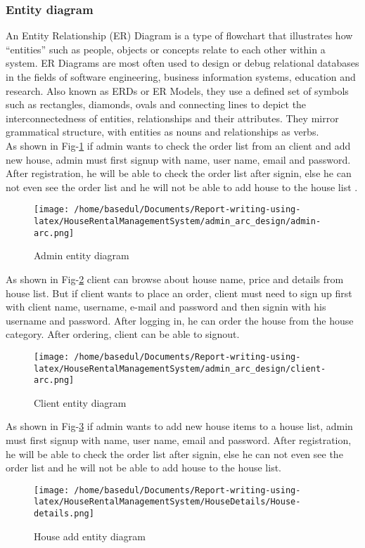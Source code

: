 \documentclass[12pt,a4paper]{article}
\newcommand\tab[1][.7cm]{\hspace*{#1}}
\begin{document}
	\subsubsection{Entity diagram}
	\tab An Entity Relationship (ER) Diagram \cite{Ref:13} is a type of flowchart that illustrates how “entities” such as people, objects or concepts relate to each other within a system. ER Diagrams are most often used to design or debug relational databases in the fields of software engineering, business information systems, education and research. Also known as ERDs or ER Models, they use a defined set of symbols such as rectangles, diamonds, ovals and connecting lines to depict the interconnectedness of entities, relationships and their attributes. They mirror grammatical structure, with entities as nouns and relationships as verbs.\\
As shown in Fig-\ref{fig:adminreg} if admin wants to check the order list from an client and add new house, admin must first signup with name, user name, email and password. After registration, he will be able to check the order list after signin, else he can not even see the order list and he will not be able to add house to the house list . 
	\begin{figure}[H]
		\centering
		\texttt{[image: /home/basedul/Documents/Report-writing-using-latex/HouseRentalManagementSystem/admin\_arc\_design/admin-arc.png]}
		\caption{\hspace{0.35em}Admin entity diagram}
		\label{fig:adminreg} 
	\end{figure}{As shown in Fig-\ref{fig:clientreg} client can browse about house name, price and details from house list. But if client wants to place an order, client must need to sign up first with client name, username, e-mail and password and then signin with his username and password. After logging in, he can order the house from the house category. After ordering, client can be able to signout.}
	\begin{figure}[H]
		\centering
		\texttt{[image: /home/basedul/Documents/Report-writing-using-latex/HouseRentalManagementSystem/admin\_arc\_design/client-arc.png]}
		\caption{\hspace{0.35em}Client entity diagram}
		\label{fig:clientreg} 
	\end{figure}
	{As shown in Fig-\ref{fig:houseadd} if admin wants to add new house items to a house list, admin must first signup with name, user name, email and password. After registration, he will be able to check the order list after signin, else he can not even see the order list and he will not be able to add house to the house list.}
	\begin{figure}[H]
		\centering
		\texttt{[image: /home/basedul/Documents/Report-writing-using-latex/HouseRentalManagementSystem/HouseDetails/House-details.png]}
		\caption{\hspace{0.35em}House add entity diagram}
		\label{fig:houseadd} 
	\end{figure}
	
\end{document}
